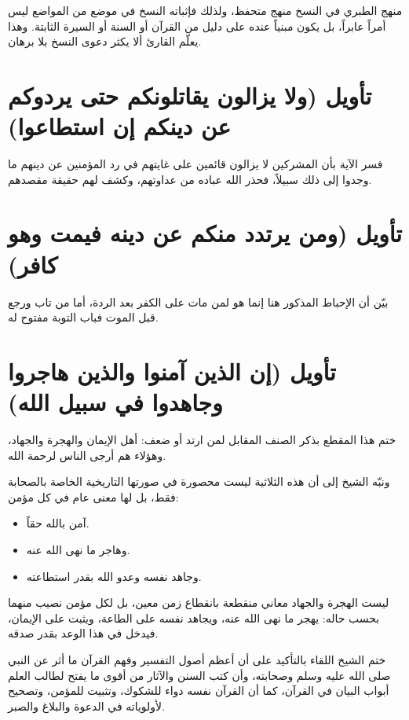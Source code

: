 \begin{fawaid}
منهج الطبري في النسخ منهج متحفظ، ولذلك فإثباته النسخ في موضع من المواضع ليس أمراً عابراً، بل يكون مبنياً عنده على دليل من القرآن أو السنة أو السيرة الثابتة. وهذا يعلّم القارئ ألا يكثر دعوى النسخ بلا برهان.
\end{fawaid}

\section{تأويل (ولا يزالون يقاتلونكم حتى يردوكم عن دينكم إن استطاعوا)}
فسر  الآية بأن المشركين لا يزالون قائمين على غايتهم في رد المؤمنين عن دينهم ما وجدوا إلى ذلك سبيلاً، فحذر الله عباده من عداوتهم، وكشف لهم حقيقة مقصدهم.

\section{تأويل (ومن يرتدد منكم عن دينه فيمت وهو كافر)}
بيّن  أن الإحباط المذكور هنا إنما هو لمن مات على الكفر بعد الردة، أما من تاب ورجع قبل الموت فباب التوبة مفتوح له.

\separator

\section{تأويل (إن الذين آمنوا والذين هاجروا وجاهدوا في سبيل الله)}
ختم  هذا المقطع بذكر الصنف المقابل لمن ارتد أو ضعف: أهل الإيمان والهجرة والجهاد، وهؤلاء هم أرجى الناس لرحمة الله.

ونبّه الشيخ إلى أن هذه الثلاثية ليست محصورة في صورتها التاريخية الخاصة بالصحابة فقط، بل لها معنى عام في كل مؤمن:
\begin{itemize}
    \item آمن بالله حقاً.
    \item وهاجر ما نهى الله عنه.
    \item وجاهد نفسه وعدو الله بقدر استطاعته.
\end{itemize}

\begin{fawaid}
ليست الهجرة والجهاد معاني منقطعة بانقطاع زمن معين، بل لكل مؤمن نصيب منهما بحسب حاله: يهجر ما نهى الله عنه، ويجاهد نفسه على الطاعة، ويثبت على الإيمان، فيدخل في هذا الوعد بقدر صدقه.
\end{fawaid}

\separator

ختم الشيخ اللقاء بالتأكيد على أن أعظم أصول التفسير وفهم القرآن ما أثر عن النبي صلى الله عليه وسلم وصحابته، وأن كتب السنن والآثار من أقوى ما يفتح لطالب العلم أبواب البيان في القرآن، كما أن القرآن نفسه دواء للشكوك، وتثبيت للمؤمن، وتصحيح لأولوياته في الدعوة والبلاغ والصبر.
